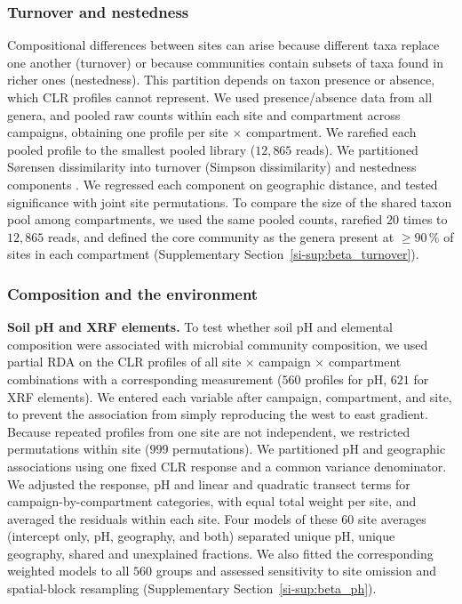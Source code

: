 \documentclass[fleqn,10pt,numbers]{olplainarticle}
\begin{document}
\subsubsection*{Turnover and nestedness}
Compositional differences between sites can arise because different taxa replace one another (turnover) or because communities contain subsets of taxa found in richer ones (nestedness). This partition depends on taxon presence or absence, which CLR profiles cannot represent. We used presence/absence data from all genera, and pooled raw counts within each site and compartment across campaigns, obtaining one profile per site $\times$ compartment. We rarefied each pooled profile to the smallest pooled library ($12{,}865$ reads). We partitioned S\o{}rensen dissimilarity into turnover (Simpson dissimilarity) and nestedness components \cite{baselga2010partition}. We regressed each component on geographic distance, and tested significance with joint site permutations. To compare the size of the shared taxon pool among compartments, we used the same pooled counts, rarefied $20$ times to $12{,}865$ reads, and defined the core community as the genera present at $\geq 90\,\%$ of sites in each compartment (Supplementary Section~\ref{si-sup:beta_turnover}).

\subsubsection*{Composition and the environment}

\textbf{Soil pH and XRF elements.} To test whether soil pH and elemental composition were associated with microbial community composition, we used partial RDA on the CLR profiles of all site $\times$ campaign $\times$ compartment combinations with a corresponding measurement ($560$ profiles for pH, $621$ for XRF elements). We entered each variable after campaign, compartment, and site, to prevent the association from simply reproducing the west to east gradient. Because repeated profiles from one site are not independent, we restricted permutations within site ($999$ permutations). We partitioned pH and geographic associations using one fixed CLR response and a common variance denominator. We adjusted the response, pH and linear and quadratic transect terms for campaign-by-compartment categories, with equal total weight per site, and averaged the residuals within each site. Four models of these $60$ site averages (intercept only, pH, geography, and both) separated unique pH, unique geography, shared and unexplained fractions. We also fitted the corresponding weighted models to all $560$ groups and assessed sensitivity to site omission and spatial-block resampling (Supplementary Section~\ref{si-sup:beta_ph}).
\end{document}
